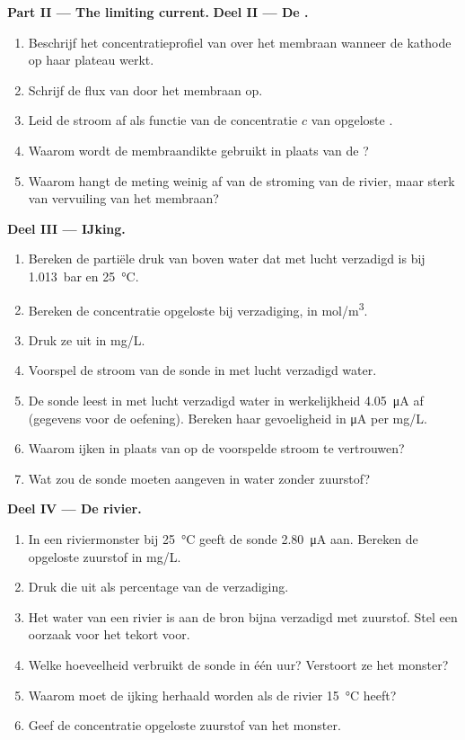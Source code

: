 \begin{problem}
\medskip
\noindent\textbf{Part II --- The limiting current.}
\noindent\textbf{Deel II --- De .}
\begin{enumerate}[resume]
  \item Beschrijf het concentratieprofiel van  over het membraan wanneer de
        kathode op haar plateau werkt.
  \item Schrijf de flux van  door het membraan op.
  \item Leid de stroom af als functie van de concentratie $c$ van opgeloste
        .
  \item Waarom wordt de membraandikte gebruikt in plaats van de ?
  \item Waarom hangt de meting weinig af van de stroming van de rivier, maar
        sterk van vervuiling van het membraan?
\end{enumerate}

\medskip
\noindent\textbf{Deel III --- IJking.}
\begin{enumerate}[resume]
  \item Bereken de partiële druk van  boven water dat met lucht verzadigd is bij
        \qty{1.013}{bar} en \qty{25}{\degreeCelsius}.
  \item Bereken de concentratie opgeloste  bij verzadiging, in
        \unit{mol/m^3}.
  \item Druk ze uit in \unit{mg/L}.
  \item Voorspel de stroom van de sonde in met lucht verzadigd water.
  \item De sonde leest in met lucht verzadigd water in werkelijkheid \qty{4.05}{\micro A} af
        (gegevens voor de oefening). Bereken haar gevoeligheid in \unit{\micro A} per
        \unit{mg/L}.
  \item Waarom ijken in plaats van op de voorspelde stroom te vertrouwen?
  \item Wat zou de sonde moeten aangeven in water zonder zuurstof?
\end{enumerate}

\medskip
\noindent\textbf{Deel IV --- De rivier.}
\begin{enumerate}[resume]
  \item In een riviermonster bij \qty{25}{\degreeCelsius} geeft de sonde
        \qty{2.80}{\micro A} aan. Bereken de opgeloste zuurstof in \unit{mg/L}.
  \item Druk die uit als percentage van de verzadiging.
  \item Het water van een rivier is aan de bron bijna verzadigd met zuurstof.
        Stel een oorzaak voor het tekort voor.
  \item Welke hoeveelheid  verbruikt de sonde in één uur? Verstoort ze
        het monster?
  \item Waarom moet de ijking herhaald worden als de rivier \qty{15}{\degreeCelsius} heeft?
  \item Geef de concentratie opgeloste zuurstof van het monster.
\end{enumerate}
\end{problem}
